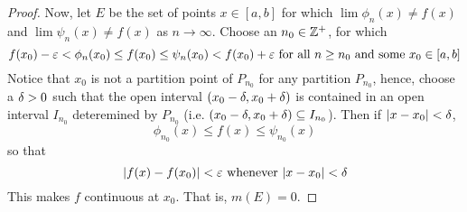 \begin{proof}
    Now, let $E$ be the set of points $x \in [a,b]$ for which $\lim{\phi_n(x)}
    \neq f(x)$ and $\lim{\psi_n(x)} \neq f(x)$ as $n \xrightarrow{} \infty$.
    Choose an $n_0 \in \mathbb{Z}^+$, for which
    \begin{equation*}
        f(x_0)-\varepsilon<\phi_n(x_0) \leq f(x_0) \leq \psi_n(x_0)<f(x_0)+\varepsilon
        \text{ for all } n \geq n_0 \text{ and some } x_0 \in [a,b]
    \end{equation*}
    Notice that $x_0$ is not a partition point of $P_{n_0}$ for any partition
    $P_{n_0}$, hence, choose a $\delta>0$ such that the open interval
    $(x_0-\delta,x_0+\delta)$ is contained in an open interval $I_{n_0}$ deteremined by
    $P_{n_0}$ (i.e. $(x_0-\delta,x_0+\delta) \subseteq I_{n_0}$). Then if $|x-x_0|<\delta$,
    \begin{equation*}
        \phi_{n_0}(x) \leq f(x) \leq \psi_{n_0}(x)
    \end{equation*}
    so that
    \begin{equation*}
        |f(x)-f(x_0)|<\varepsilon \text{ whenever } |x-x_0|<\delta
    \end{equation*}
    This makes $f$ continuous at  $x_0$. That is, $m(E)=0$.


\end{proof}
